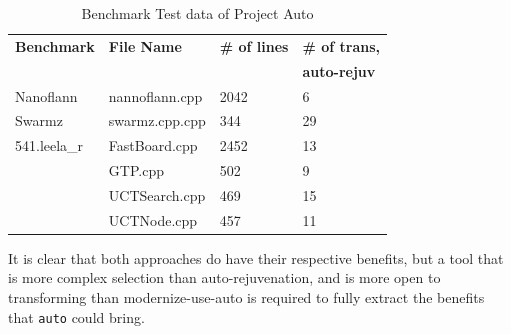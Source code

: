 \documentclass[bsc,frontabs,singlespacing,twoside,parskip,deptreport]{infthesis}
\begin{document}


\begin{table}[H]
    \begin{center}
        \begin{tabular}{| l | l | l | l |}
            \hline
            \textbf{Benchmark}    & \textbf{File Name}    & \textbf{\# of lines}  & \textbf{\# of trans,} \\
                                  &                       &                       & \textbf{auto-rejuv}   \\ \hline
            Nanoflann    & nannoflann.cpp   & 2042  & 6  \\ \hline
            Swarmz       & swarmz.cpp.cpp   & 344   & 29 \\ \hline
            541.leela\_r & FastBoard.cpp    & 2452	& 13 \\ \hline
                         & GTP.cpp          & 502	& 9  \\ \hline
                         & UCTSearch.cpp    & 469   & 15 \\ \hline
                         & UCTNode.cpp	    & 457   & 11 \\ \hline
        \end{tabular}
        \caption{Benchmark Test data of Project Auto }
        \label{tab:auto-tool-benchmark-type-limit}
    \end{center}
\end{table}

It is clear that both approaches do have their respective benefits, but a tool that is more complex selection than auto-rejuvenation, and is more open to transforming than modernize-use-auto is required to fully extract the benefits that \texttt{auto} could bring.

\end{document}
